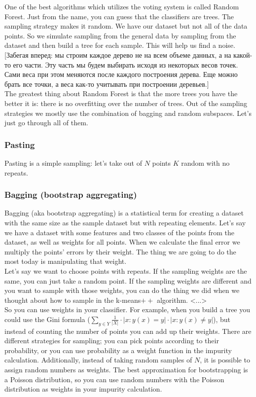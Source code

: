 One of the best algorithms which utilizes the voting system is called Random Forest. Just from the name, you can guess that the classifiers are trees. The sampling strategy makes it random. We have our dataset but not all of the data points. So we simulate sampling from the general data by sampling from the dataset and then build a tree for each sample. This will help us find a noise. [Забегая вперед: мы строим каждое дерево не на всем объеме данных, а на какой-то его части. Эту часть мы будем выбирать исходя из некоторых весов точек. Сами веса при этом меняются после каждого построения дерева. Еще можно брать все точки, а веса как-то учитывать при построении деревьев.]\\
The greatest thing about Random Forest is that the more trees you have the better it is: there is no overfitting over the number of trees. Out of the sampling strategies we mostly use the combination of bagging and random subspaces. Let's just go through all of them.

\subsubsection*{Pasting}

Pasting is a simple sampling: let's take out of $N$ points $K$ random with no repeats.

\subsubsection*{Bagging (bootstrap aggregating)}

Bagging (aka bootstrap aggregating) is a statistical term for creating a dataset with the same size as the sample dataset but with repeating elements. Let's say we have a dataset with some features and two classes of the points from the dataset, as well as weights for all points. When we calculate the final error we multiply the points' errors by their weight. The thing we are going to do the most today is manipulating that weight. \\
Let's say we want to choose points with repeats. If the sampling weights are the same, you can just take a random point. If the sampling weights are different and you want to sample with those weights, you can do the thing we did when we thought about how to sample in the k-means$++$ algorithm. <...> \\
So you can use weights in your classifier. For example, when you build a tree you could use the Gini formula ($\sum_{y\in Y}\frac{1}{|X|}\cdot|x: y(x) =y|\cdot|x: y(x) \ne y|$), but instead of counting the number of points you can add up their weights. 
There are different strategies for sampling; you can pick points according to their probability, or you can use probability as a weight function in the impurity calculation. Additionally, instead of taking random samples of $N$, it is possible to assign random numbers as weights. The best approximation for bootstrapping is a Poisson distribution, so you can use random numbers with the Poisson distribution as weights in your impurity calculation.


